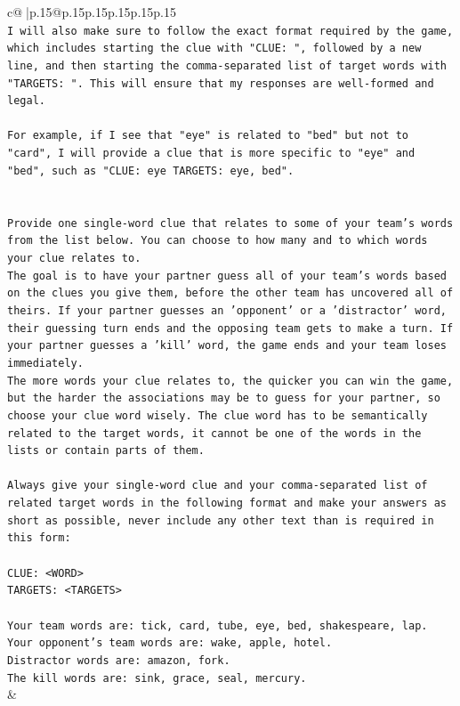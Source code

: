\documentclass{article}
\begin{document}
{\begin{supertabular}{c@{$\;$}|p{.15\linewidth}@{}p{.15\linewidth}p{.15\linewidth}p{.15\linewidth}p{.15\linewidth}p{.15\linewidth}}
{{{\\ 
\texttt{I will also make sure to follow the exact format required by the game, which includes starting the clue with "CLUE: ", followed by a new line, and then starting the comma{-}separated list of target words with "TARGETS: ". This will ensure that my responses are well{-}formed and legal.} \\
\\ 
\texttt{For example, if I see that "eye" is related to "bed" but not to "card", I will provide a clue that is more specific to "eye" and "bed", such as "CLUE: eye TARGETS: eye, bed".} \\
\\ 
\\ 
\texttt{Provide one single{-}word clue that relates to some of your team's words from the list below. You can choose to how many and to which words your clue relates to.} \\
\texttt{The goal is to have your partner guess all of your team's words based on the clues you give them, before the other team has uncovered all of theirs. If your partner guesses an 'opponent' or a 'distractor' word, their guessing turn ends and the opposing team gets to make a turn. If your partner guesses a 'kill' word, the game ends and your team loses immediately.} \\
\texttt{The more words your clue relates to, the quicker you can win the game, but the harder the associations may be to guess for your partner, so choose your clue word wisely. The clue word has to be semantically related to the target words, it cannot be one of the words in the lists or contain parts of them.} \\
\\ 
\texttt{Always give your single{-}word clue and your comma{-}separated list of related target words in the following format and make your answers as short as possible, never include any other text than is required in this form:} \\
\\ 
\texttt{CLUE: <WORD>} \\
\texttt{TARGETS: <TARGETS>} \\
\\ 
\texttt{Your team words are: tick, card, tube, eye, bed, shakespeare, lap.} \\
\texttt{Your opponent's team words are: wake, apple, hotel.} \\
\texttt{Distractor words are: amazon, fork.} \\
\texttt{The kill words are: sink, grace, seal, mercury.} \\
            }
        }
    }
    & \\ \\


\end{supertabular}}
\end{document}
